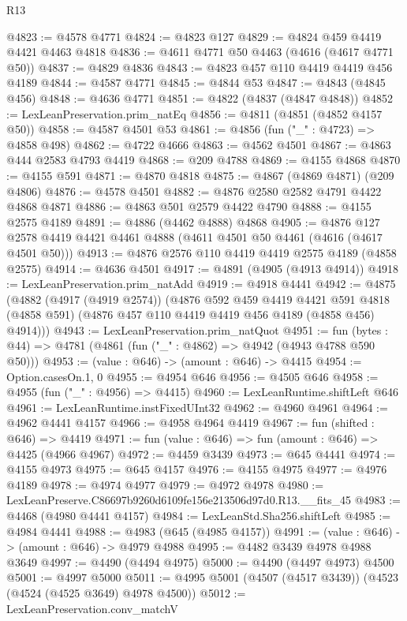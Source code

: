 \begin{lexlean}{R13}
\begin{coremodule}
@4823 := @4578 @4771
@4824 := @4823 @127
@4829 := @4824 @459 @4419 @4421 @4463 @4818
@4836 := @4611 @4771 @50 @4463 (@4616 (@4617 @4771 @50))
@4837 := @4829 @4836
@4843 := @4823 @457 @110 @4419 @4419 @456 @4189
@4844 := @4587 @4771
@4845 := @4844 @53
@4847 := @4843 (@4845 @456)
@4848 := @4636 @4771
@4851 := @4822 (@4837 (@4847 @4848))
@4852 := LexLeanPreservation.prim_natEq
@4856 := @4811 (@4851 (@4852 @4157 @50))
@4858 := @4587 @4501 @53
@4861 := @4856 (fun ("_" : @4723) => @4858 @498)
@4862 := @4722 @4666
@4863 := @4562 @4501
@4867 := @4863 @444 @2583 @4793 @4419
@4868 := @209 @4788
@4869 := @4155 @4868
@4870 := @4155 @591
@4871 := @4870 @4818
@4875 := @4867 (@4869 @4871) (@209 @4806)
@4876 := @4578 @4501
@4882 := @4876 @2580 @2582 @4791 @4422 @4868 @4871
@4886 := @4863 @501 @2579 @4422 @4790
@4888 := @4155 @2575 @4189
@4891 := @4886 (@4462 @4888) @4868
@4905 := @4876 @127 @2578 @4419 @4421 @4461 @4888 (@4611 @4501 @50 @4461 (@4616 (@4617 @4501 @50)))
@4913 := @4876 @2576 @110 @4419 @4419 @2575 @4189 (@4858 @2575)
@4914 := @4636 @4501
@4917 := @4891 (@4905 (@4913 @4914))
@4918 := LexLeanPreservation.prim_natAdd
@4919 := @4918 @4441
@4942 := @4875
    (@4882
      (@4917 (@4919 @2574))
      (@4876
        @592
        @459
        @4419
        @4421
        @591
        @4818
        (@4858 @591)
        (@4876 @457 @110 @4419 @4419 @456 @4189 (@4858 @456) @4914)))
@4943 := LexLeanPreservation.prim_natQuot
@4951 := fun (bytes : @44) => @4781 (@4861 (fun ("_" : @4862) => @4942 (@4943 @4788 @590 @50)))
@4953 := (value : @646) -> (amount : @646) -> @4415
@4954 := Option.casesOn.{1, 0}
@4955 := @4954 @646
@4956 := @4505 @646
@4958 := @4955 (fun ("_" : @4956) => @4415)
@4960 := LexLeanRuntime.shiftLeft @646
@4961 := LexLeanRuntime.instFixedUInt32
@4962 := @4960 @4961
@4964 := @4962 @4441 @4157
@4966 := @4958 @4964 @4419
@4967 := fun (shifted : @646) => @4419
@4971 := fun (value : @646) => fun (amount : @646) => @4425 (@4966 @4967)
@4972 := @4459 @3439
@4973 := @645 @4441
@4974 := @4155 @4973
@4975 := @645 @4157
@4976 := @4155 @4975
@4977 := @4976 @4189
@4978 := @4974 @4977
@4979 := @4972 @4978
@4980 := LexLeanPreserve.C86697b9260d6109fe156e213506d97d0.R13.__fits_45
@4983 := @4468 (@4980 @4441 @4157)
@4984 := LexLeanStd.Sha256.shiftLeft
@4985 := @4984 @4441
@4988 := @4983 (@645 (@4985 @4157))
@4991 := (value : @646) -> (amount : @646) -> @4979 @4988
@4995 := @4482 @3439 @4978 @4988 @3649
@4997 := @4490 (@4494 @4975)
@5000 := @4490 (@4497 @4973) @4500
@5001 := @4997 @5000
@5011 := @4995 @5001 (@4507 (@4517 @3439)) (@4523 (@4524 (@4525 @3649) @4978 @4500))
@5012 := LexLeanPreservation.conv_matchV

\end{coremodule}
\end{lexlean}
